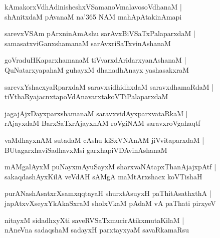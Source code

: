 \documentclass[twoside,12pt,openright]{book}
\newcounter{shloka}[chapter]
\begin{document}
\begin{shloka}%
kAmakorxVdhAdinisheshxVSamanoVmalavosoVdhanaM |\\
shAnitxdaM pAvanaM na\char'365 NAM mahApAtakinAmapi
\end{shloka}

\begin{shloka}%
sarevxVSAm pArxninAmAshu sarAvxBiVSaTxPalaparxdaM |\\
samasatxviGanxshamanaM sarAvxriSaTxvinAshanaM 
\end{shloka}

\begin{shloka}%
goVraduHKaparxhamanaM tiVvarxdAridarxyanAshanaM |\\
QuNatarxyapahaM guhayxM dhanadhAnayx yashasakxraM 
\end{shloka}

\begin{shloka}%
sarevxYshacxyaRparxdaM saravxsidhidhxdaM saravxdhamaRdaM |\\
tiVthaRyajacnxtapoVdAnavarxtakoVTiPalaparxdaM
\end{shloka}

\begin{shloka}%
jagajAjxDayxparxshamanaM saravxvidAyxparxvataRkaM |\\
rAjayxdaM BarxSaTxrAjayxnAM roVgiNAM saravxroVgahaqtf
\end{shloka}

\begin{shloka}%
vaMdhayxnAM sutadaM cAshu kiSxVNAnAM jiVvitaparxdaM |\\
BUtagarxhaviSadhavxMsi garxhapiVDAvinAshanaM 
\end{shloka}

\begin{shloka}%
mAMgalAyxM puNayxmAyuSayxM sharxvaNAtapxThanAjajxpAtf |\\
sakaqdashAyxKilA veVdAH sAMgA maMtArxshacx koVTishaH 
\end{shloka}

\begin{shloka}%
purANashAsatxrXsamxqqtayaH shurxtAsuyxH paThitAsathxthA |\\
japAtxvXseyxYkAkaSxraM sholxVkaM pAdaM vA paThati pirxyeV 
\end{shloka}

\begin{shloka}%
nitayxM sidadhxyXti saveRVSaTxmucirAtikxmutaKilaM |\\
nAneVna sadaqshaM sadayxH parxtayxyaM savaRkamaRsu
\end{shloka}
\end{document}
